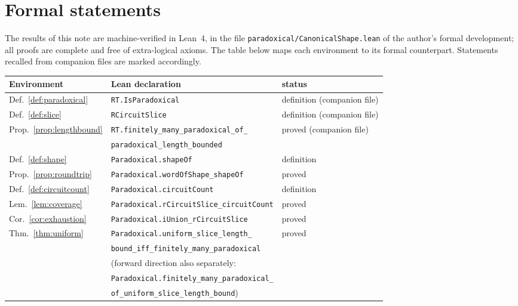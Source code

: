 \documentclass[11pt]{amsart}
\theoremstyle{plain}
\theoremstyle{definition}
\theoremstyle{remark}
\begin{document}
\appendix

\section{Formal statements}\label{app:lean}

The results of this note are machine-verified in Lean~4, in the file
\texttt{paradoxical/CanonicalShape.lean} of the author's formal development;
all proofs are complete and free of extra-logical axioms.  The table below
maps each environment to its formal counterpart.  Statements recalled from
companion files are marked accordingly.

\begin{center}
\begin{tabular}{lll}
\toprule
Environment & Lean declaration & status \\
\midrule
Def.~\ref{def:paradoxical} & \texttt{RT.IsParadoxical} & definition (companion file) \\
Def.~\ref{def:slice} & \texttt{RCircuitSlice} & definition (companion file) \\
Prop.~\ref{prop:lengthbound} & \texttt{RT.finitely\_many\_paradoxical\_of\_} & proved (companion file) \\
 & \quad\texttt{paradoxical\_length\_bounded} & \\
Def.~\ref{def:shape} & \texttt{Paradoxical.shapeOf} & definition \\
Prop.~\ref{prop:roundtrip} & \texttt{Paradoxical.wordOfShape\_shapeOf} & proved \\
Def.~\ref{def:circuitcount} & \texttt{Paradoxical.circuitCount} & definition \\
Lem.~\ref{lem:coverage} & \texttt{Paradoxical.rCircuitSlice\_circuitCount} & proved \\
Cor.~\ref{cor:exhaustion} & \texttt{Paradoxical.iUnion\_rCircuitSlice} & proved \\
Thm.~\ref{thm:uniform} & \texttt{Paradoxical.uniform\_slice\_length\_} & proved \\
 & \quad\texttt{bound\_iff\_finitely\_many\_paradoxical} & \\
 & (forward direction also separately: & \\
 & \quad\texttt{Paradoxical.finitely\_many\_paradoxical\_} & \\
 & \quad\texttt{of\_uniform\_slice\_length\_bound}) & \\
\bottomrule
\end{tabular}
\end{center}
\end{document}
